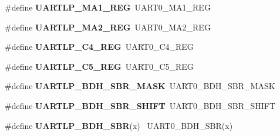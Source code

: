 \begin{DoxyCompactItemize}
\item 
\hypertarget{group___backward___compatibility___symbols_ga0a75f00126e8c79685573b4b676a7638}{}\#define {\bfseries U\+A\+R\+T\+L\+P\+\_\+\+M\+A1\+\_\+\+R\+E\+G}~U\+A\+R\+T0\+\_\+\+M\+A1\+\_\+\+R\+E\+G\label{group___backward___compatibility___symbols_ga0a75f00126e8c79685573b4b676a7638}

\item 
\hypertarget{group___backward___compatibility___symbols_ga88eb460f480938f175efb58b54db515c}{}\#define {\bfseries U\+A\+R\+T\+L\+P\+\_\+\+M\+A2\+\_\+\+R\+E\+G}~U\+A\+R\+T0\+\_\+\+M\+A2\+\_\+\+R\+E\+G\label{group___backward___compatibility___symbols_ga88eb460f480938f175efb58b54db515c}

\item 
\hypertarget{group___backward___compatibility___symbols_gaf72e56d7ea7d8a9c232d8ec3660b7451}{}\#define {\bfseries U\+A\+R\+T\+L\+P\+\_\+\+C4\+\_\+\+R\+E\+G}~U\+A\+R\+T0\+\_\+\+C4\+\_\+\+R\+E\+G\label{group___backward___compatibility___symbols_gaf72e56d7ea7d8a9c232d8ec3660b7451}

\item 
\hypertarget{group___backward___compatibility___symbols_gabc0ed230faba55a9874ca37a592326b3}{}\#define {\bfseries U\+A\+R\+T\+L\+P\+\_\+\+C5\+\_\+\+R\+E\+G}~U\+A\+R\+T0\+\_\+\+C5\+\_\+\+R\+E\+G\label{group___backward___compatibility___symbols_gabc0ed230faba55a9874ca37a592326b3}

\item 
\hypertarget{group___backward___compatibility___symbols_ga0654a0aae3440ab5346eb9ecc4bd86d6}{}\#define {\bfseries U\+A\+R\+T\+L\+P\+\_\+\+B\+D\+H\+\_\+\+S\+B\+R\+\_\+\+M\+A\+S\+K}~U\+A\+R\+T0\+\_\+\+B\+D\+H\+\_\+\+S\+B\+R\+\_\+\+M\+A\+S\+K\label{group___backward___compatibility___symbols_ga0654a0aae3440ab5346eb9ecc4bd86d6}

\item 
\hypertarget{group___backward___compatibility___symbols_ga564ff56e5370588f01e2bc1a4e14d191}{}\#define {\bfseries U\+A\+R\+T\+L\+P\+\_\+\+B\+D\+H\+\_\+\+S\+B\+R\+\_\+\+S\+H\+I\+F\+T}~U\+A\+R\+T0\+\_\+\+B\+D\+H\+\_\+\+S\+B\+R\+\_\+\+S\+H\+I\+F\+T\label{group___backward___compatibility___symbols_ga564ff56e5370588f01e2bc1a4e14d191}

\item 
\hypertarget{group___backward___compatibility___symbols_ga0889ff385f4379ab9f34e1de3e5c72e1}{}\#define {\bfseries U\+A\+R\+T\+L\+P\+\_\+\+B\+D\+H\+\_\+\+S\+B\+R}(x)                                            ~U\+A\+R\+T0\+\_\+\+B\+D\+H\+\_\+\+S\+B\+R(x)\label{group___backward___compatibility___symbols_ga0889ff385f4379ab9f34e1de3e5c72e1}


\end{DoxyCompactItemize}
